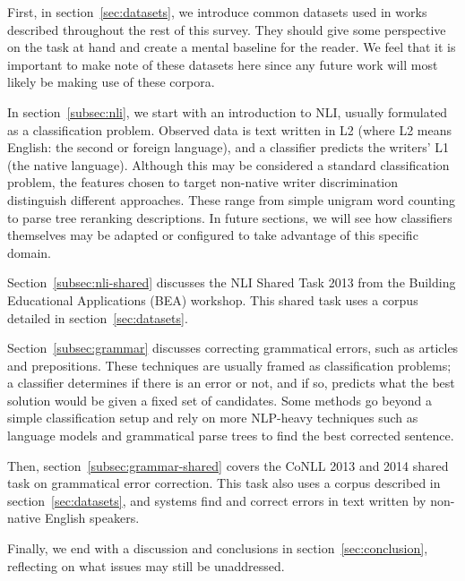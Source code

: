 First, in section~\ref{sec:datasets}, we introduce common datasets used in works
described throughout the rest of this survey. They should give some perspective
on the task at hand and create a mental baseline for the reader. We feel that it
is important to make note of these datasets here since any future work will most
likely be making use of these corpora.

In section~\ref{subsec:nli}, we start with an introduction to NLI, usually
formulated as a classification problem. Observed data is text written in L2
(where L2 means English: the second or foreign language), and a classifier
predicts the writers' L1 (the native language). Although this may be considered
a standard classification problem, the features chosen to target non-native
writer discrimination distinguish different approaches. These range from simple
unigram word counting to parse tree reranking descriptions. In future sections,
we will see how classifiers themselves may be adapted or configured to take
advantage of this specific domain.

Section~\ref{subsec:nli-shared} discusses the NLI Shared Task 2013 from the
Building Educational Applications (BEA) workshop. This shared task uses a corpus
detailed in section~\ref{sec:datasets}.

Section~\ref{subsec:grammar} discusses correcting grammatical errors, such as
articles and prepositions. These techniques are usually framed as classification
problems; a classifier determines if there is an error or not, and if so,
predicts what the best solution would be given a fixed set of candidates. Some
methods go beyond a simple classification setup and rely on more NLP-heavy
techniques such as language models and grammatical parse trees to find the
best corrected sentence.

Then, section~\ref{subsec:grammar-shared} covers the CoNLL 2013 and 2014 shared
task on grammatical error correction. This task also uses a corpus described in
section~\ref{sec:datasets}, and systems find and correct errors in text written
by non-native English speakers.

Finally, we end with a discussion and conclusions in
section~\ref{sec:conclusion}, reflecting on what issues may still be
unaddressed.
